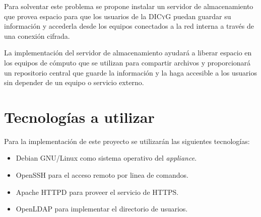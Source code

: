 Para solventar este problema se propone instalar un servidor de almacenamiento que provea espacio para que los usuarios de la \textsc{DICyG} puedan guardar su informaci\'{o}n y accederla desde los equipos conectados a la red interna a trav\'{e}s de una conexi\'{o}n cifrada.

La implementaci\'{o}n del servidor de almacenamiento ayudar\'{a} a liberar espacio en los equipos de c\'{o}mputo que se utilizan para compartir archivos y proporcionar\'{a} un repositorio central que guarde la informaci\'{o}n y la haga accesible a los usuarios sin depender de un equipo o servicio externo.


    \section {Tecnolog\'{i}as a utilizar}

Para la implementaci\'{o}n de este proyecto se utilizar\'{a}n las siguientes tecnolog\'{i}as:

\begin{itemize}
  \item Debian GNU/Linux como sistema operativo del \textit{appliance}.
  \item OpenSSH para el acceso remoto por linea de comandos.
  \item Apache HTTPD para proveer el servicio de HTTPS.
  \item OpenLDAP para implementar el directorio de usuarios.
\end{itemize}


